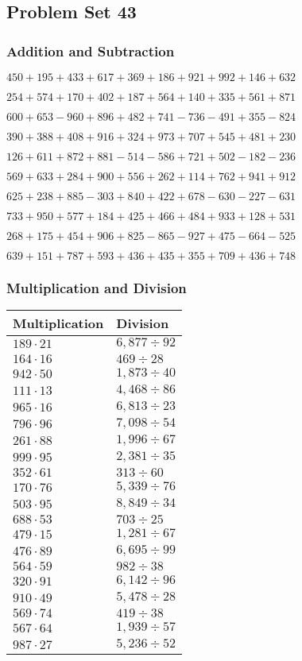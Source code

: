 \hypertarget{problem-set-43-1}{%
\subsection{Problem Set 43}\label{problem-set-43-1}}

\hypertarget{addition-and-subtraction-143}{%
\subsubsection{Addition and
Subtraction}\label{addition-and-subtraction-143}}

\(450 + 195 + 433 + 617 + 369 + 186 + 921 + 992 + 146 + 632\)

\(254 + 574 + 170 + 402 + 187 + 564 + 140 + 335 + 561 + 871\)

\(600 + 653 - 960 + 896 + 482 + 741 - 736 - 491 + 355 - 824\)

\(390 + 388 + 408 + 916 + 324 + 973 + 707 + 545 + 481 + 230\)

\(126 + 611 + 872 + 881 - 514 - 586 + 721 + 502 - 182 - 236\)

\(569 + 633 + 284 + 900 + 556 + 262 + 114 + 762 + 941 + 912\)

\(625 + 238 + 885 - 303 + 840 + 422 + 678 - 630 - 227 - 631\)

\(733 + 950 + 577 + 184 + 425 + 466 + 484 + 933 + 128 + 531\)

\(268 + 175 + 454 + 906 + 825 - 865 - 927 + 475 - 664 - 525\)

\(639 + 151 + 787 + 593 + 436 + 435 + 355 + 709 + 436 + 748\)

\hypertarget{multiplication-and-division-143}{%
\subsubsection{Multiplication and
Division}\label{multiplication-and-division-143}}

\begin{longtable}[]{@{}ll@{}}
\toprule
Multiplication & Division\tabularnewline
\midrule
\endhead
\(189 \cdot 21\) & \(6,877÷92\)\tabularnewline
\(164 \cdot 16\) & \(469÷28\)\tabularnewline
\(942 \cdot 50\) & \(1,873÷40\)\tabularnewline
\(111 \cdot 13\) & \(4,468÷86\)\tabularnewline
\(965 \cdot 16\) & \(6,813÷23\)\tabularnewline
\(796 \cdot 96\) & \(7,098÷54\)\tabularnewline
\(261 \cdot 88\) & \(1,996÷67\)\tabularnewline
\(999 \cdot 95\) & \(2,381÷35\)\tabularnewline
\(352 \cdot 61\) & \(313÷60\)\tabularnewline
\(170 \cdot 76\) & \(5,339÷76\)\tabularnewline
\(503 \cdot 95\) & \(8,849÷34\)\tabularnewline
\(688 \cdot 53\) & \(703÷25\)\tabularnewline
\(479 \cdot 15\) & \(1,281÷67\)\tabularnewline
\(476 \cdot 89\) & \(6,695÷99\)\tabularnewline
\(564 \cdot 59\) & \(982÷38\)\tabularnewline
\(320 \cdot 91\) & \(6,142÷96\)\tabularnewline
\(910 \cdot 49\) & \(5,478÷28\)\tabularnewline
\(569 \cdot 74\) & \(419÷38\)\tabularnewline
\(567 \cdot 64\) & \(1,939÷57\)\tabularnewline
\(987 \cdot 27\) & \(5,236÷52\)\tabularnewline
\bottomrule
\end{longtable}


